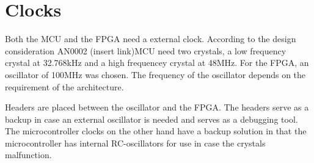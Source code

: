 \documentclass[../main/report.tex]{subfiles}
\begin{document}
\section{Clocks}
Both the MCU and the FPGA need a external clock.
According to the design consideration AN0002 (insert link)MCU need two crystals, a low frequency crystal at 32.768kHz and a high frequencey crystal at 48MHz. 
For the FPGA, an oscillator of 100MHz was chosen. The frequency of the oscillator depends on the requirement of the architecture.

Headers are placed between the oscillator and the FPGA. 
The headers serve as a backup in case an external oscillator is needed and serves as a debugging tool.
The microcontroller clocks on the other hand have a backup solution in that the microcontroller has internal RC-oscillators for use in case the crystals malfunction.
\end{document}
